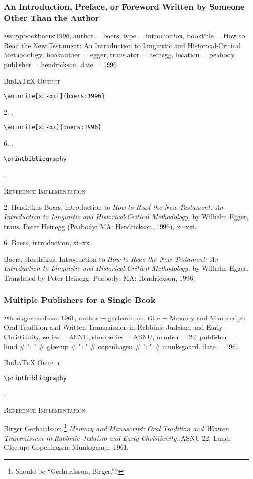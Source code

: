 \documentclass[a4paper]{article}
\newcommand\citetest[5]{%
  {\textsc{BibLaTeX Output}\par
   \nobreak
   \texttt{\textbackslash autocite[#2]\{#5\}}\par
   \color{biblatex-colour}
   #1. \cite[#2]{#5}.\par
   \color{black}
   \texttt{\textbackslash autocite[#4]\{#5\}}\par
   \color{biblatex-colour}
   #3. \cite[#4]{#5}.\par
   \color{black}
   \texttt{\textbackslash printbibliography}\par
   \color{biblatex-colour}
   \hangindent\bibindent\bibentrycite{#5}.\par}}
\newcommand\citetestbib[1]{%
  {\textsc{BibLaTeX Output}\par
   \nobreak
   \color{black}
   \texttt{\textbackslash printbibliography}\par
   \color{biblatex-colour}
   \hangindent\bibindent\bibentrycite{#1}.\par}}
\newenvironment{refimp}{%
  \begin{minipage}{\linewidth}
    \setlength{\parskip}{1ex}
    \textsc{Reference Implementation}\par
    \nobreak
    \color{reference-colour}
}{\end{minipage}}
\newenvironment{vb}{%
  \setlength{\parskip}{0pt}
  \verbatim}{\endverbatim}
\begin{document}
\subsubsection{An Introduction, Preface, or Foreword Written by Someone Other
Than the Author}

\begin{vb}
@suppbook{boers:1996,
  author = boers,
  type = {introduction},
  booktitle = {How to Read the New Testament: An Introduction to
               Linguistic and Historical-Critical Methodology},
  bookauthor = egger,
  translator = heinegg,
  location = peabody,
  publisher = hendrickson,
  date = {1996}
}
\end{vb}  

\citetest{2}{xi-xxi}{6}{xi-xx}{boers:1996}

\begin{refimp}
  2. Hendrikus Boers, introduction to \emph{How to Read the New Testament: An
  Introduction to Linguistic and Historical-Critical Methodology,} by Wilhelm
  Egger, trans. Peter Heinegg (Peabody; MA: Hendrickson, 1996), xi–xxi.

  6. Boers, introduction, xi–xx.

  \hangindent\bibindent Boers, Hendrikus. Introduction to \emph{How to Read
  the New Testament: An Introduction to Linguistic and Historical-Critical
  Methodology,} by Wilhelm Egger. Translated by Peter Heinegg. Peabody; MA:
  Hendrickson, 1996.
\end{refimp}

\subsubsection{Multiple Publishers for a Single Book}

\begin{vb}
@book{gerhardsson:1961,
  author = gerhardsson,
  title = {Memory and Manuscript: Oral Tradition and Written
           Transmission in Rabbinic Judaism and Early Christianity},
  series = ASNU,
  shortseries = {ASNU},
  number = {22},
  publisher = lund # ": " # gleerup # "; " #
              copenhagen # ": " # munksgaard,
  date = {1961}
}
\end{vb}

\citetestbib{gerhardsson:1961}

\begin{refimp}
  \hangindent\bibindent Birger Gerhardsson,\footnote{Should be “Gerhardsson,
  Birger.”?} \emph{Memory and Manuscript: Oral Tradition and Written
  Transmission in Rabbinic Judaism and Early Christianity.} ASNU 22. Lund:
  Gleerup; Copenhagen: Munksgaard, 1961.
\end{refimp}
\end{document}

